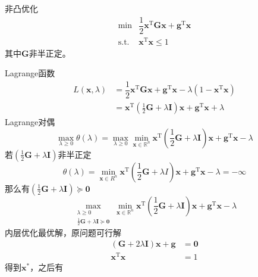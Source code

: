 \begin{example}
    非凸优化
    \[
        \begin{array}{rl}
            \min&\dfrac{1}{2}\boldsymbol{x}^\mathrm{T}\boldsymbol{Gx}+\boldsymbol{g}^\mathrm{T}\boldsymbol{x}\\
            \mathrm{s.t.}&\boldsymbol{x}^\mathrm{T}\boldsymbol{x}\leqslant1
        \end{array}
    \]
    其中$\boldsymbol{G}$非半正定。
    \begin{solution}
        Lagrange函数
        \[
            \begin{aligned}
                L(\boldsymbol{x},\lambda)&=\dfrac{1}{2}\boldsymbol{x}^{\mathrm{T}}\boldsymbol{Gx}+\boldsymbol{g}^{\mathrm{T}}\boldsymbol{x}-\lambda(1-\boldsymbol{x}^{\mathrm{T}}\boldsymbol{x})\\
                &=\boldsymbol{x}^{\mathrm{T}}(\frac{1}{2}\boldsymbol{G}+\lambda\boldsymbol{I})\boldsymbol{x}+\boldsymbol{g}^{\mathrm{T}}\boldsymbol{x}+\lambda 
            \end{aligned}
        \]
        Lagrange对偶
        \[
            \max_{\lambda\geq 0}\theta(\lambda)=\max_{\lambda\geq 0}\min_{\boldsymbol{x}\in \mathbb{R}^n}\boldsymbol{x}^\mathrm{T}(\dfrac{1}{2}\boldsymbol{G}+\lambda\boldsymbol{I})\boldsymbol{x}+\boldsymbol{g}^\mathrm{T}\boldsymbol{x}-\lambda 
        \]
        若$(\frac12\boldsymbol{G}+\lambda\boldsymbol{I})$非半正定
        \[
            \theta(\lambda)=\min_{\boldsymbol{x}\in R^n}\boldsymbol{x}^\mathrm{T}(\frac12\boldsymbol{G}+\lambda I)\boldsymbol{x}+\boldsymbol{g}^\mathrm{T}\boldsymbol{x}-\lambda=-\infty  
        \]
        那么有$(\frac12\boldsymbol{G}+\lambda\boldsymbol{I})\succcurlyeq \boldsymbol{0}$
        \[
            \max_{\substack{\lambda\geq 0\\ \frac12\boldsymbol{G}+\lambda\boldsymbol{I}\succcurlyeq  \boldsymbol{0}}}\min_{\boldsymbol{x}\in \mathbb{R}^n}\boldsymbol{x}^\mathrm{T}(\dfrac{1}{2}\boldsymbol{G}+\lambda\boldsymbol{I})\boldsymbol{x}+\boldsymbol{g}^\mathrm{T}\boldsymbol{x}-\lambda 
        \]
        内层优化最优解，原问题可行解
        \[
            \begin{aligned}
                (\boldsymbol{G}+2\lambda\boldsymbol{I})\boldsymbol{x}+\boldsymbol{g}&=\boldsymbol{0}\\
                \boldsymbol{x}^{\mathrm{T}}\boldsymbol{x}&=1
            \end{aligned}
        \]得到$\boldsymbol{x}^*$，之后有
        \[
            \begin{array}{rl}

\end{array}\]
\end{solution}
\end{example}
